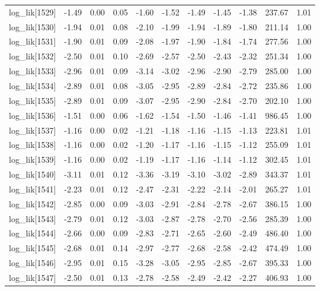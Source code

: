 \begin{table}[ht]
\begin{tabular}{rrrrrrrrrrr}
  log\_lik[1529] & -1.49 & 0.00 & 0.05 & -1.60 & -1.52 & -1.49 & -1.45 & -1.38 & 237.67 & 1.01 \\ 
  log\_lik[1530] & -1.94 & 0.01 & 0.08 & -2.10 & -1.99 & -1.94 & -1.89 & -1.80 & 211.14 & 1.00 \\ 
  log\_lik[1531] & -1.90 & 0.01 & 0.09 & -2.08 & -1.97 & -1.90 & -1.84 & -1.74 & 277.56 & 1.00 \\ 
  log\_lik[1532] & -2.50 & 0.01 & 0.10 & -2.69 & -2.57 & -2.50 & -2.43 & -2.32 & 251.34 & 1.00 \\ 
  log\_lik[1533] & -2.96 & 0.01 & 0.09 & -3.14 & -3.02 & -2.96 & -2.90 & -2.79 & 285.00 & 1.00 \\ 
  log\_lik[1534] & -2.89 & 0.01 & 0.08 & -3.05 & -2.95 & -2.89 & -2.84 & -2.72 & 235.86 & 1.00 \\ 
  log\_lik[1535] & -2.89 & 0.01 & 0.09 & -3.07 & -2.95 & -2.90 & -2.84 & -2.70 & 202.10 & 1.00 \\ 
  log\_lik[1536] & -1.51 & 0.00 & 0.06 & -1.62 & -1.54 & -1.50 & -1.46 & -1.41 & 986.45 & 1.00 \\ 
  log\_lik[1537] & -1.16 & 0.00 & 0.02 & -1.21 & -1.18 & -1.16 & -1.15 & -1.13 & 223.81 & 1.01 \\ 
  log\_lik[1538] & -1.16 & 0.00 & 0.02 & -1.20 & -1.17 & -1.16 & -1.15 & -1.12 & 255.09 & 1.01 \\ 
  log\_lik[1539] & -1.16 & 0.00 & 0.02 & -1.19 & -1.17 & -1.16 & -1.14 & -1.12 & 302.45 & 1.01 \\ 
  log\_lik[1540] & -3.11 & 0.01 & 0.12 & -3.36 & -3.19 & -3.10 & -3.02 & -2.89 & 343.37 & 1.01 \\ 
  log\_lik[1541] & -2.23 & 0.01 & 0.12 & -2.47 & -2.31 & -2.22 & -2.14 & -2.01 & 265.27 & 1.01 \\ 
  log\_lik[1542] & -2.85 & 0.00 & 0.09 & -3.03 & -2.91 & -2.84 & -2.78 & -2.67 & 386.15 & 1.00 \\ 
  log\_lik[1543] & -2.79 & 0.01 & 0.12 & -3.03 & -2.87 & -2.78 & -2.70 & -2.56 & 285.39 & 1.00 \\ 
  log\_lik[1544] & -2.66 & 0.00 & 0.09 & -2.83 & -2.71 & -2.65 & -2.60 & -2.49 & 486.40 & 1.00 \\ 
  log\_lik[1545] & -2.68 & 0.01 & 0.14 & -2.97 & -2.77 & -2.68 & -2.58 & -2.42 & 474.49 & 1.00 \\ 
  log\_lik[1546] & -2.95 & 0.01 & 0.15 & -3.28 & -3.05 & -2.95 & -2.85 & -2.67 & 395.33 & 1.00 \\ 
  log\_lik[1547] & -2.50 & 0.01 & 0.13 & -2.78 & -2.58 & -2.49 & -2.42 & -2.27 & 406.93 & 1.00 \\ 

\end{tabular}
\end{table}
